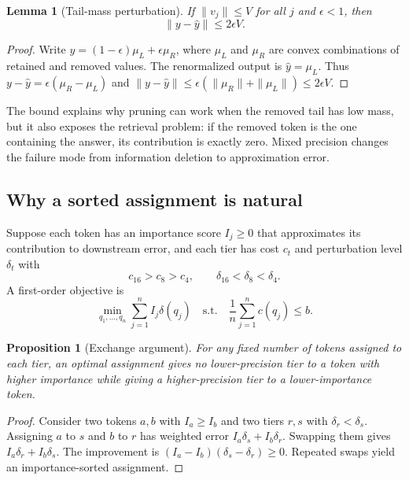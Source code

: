 \documentclass[11pt]{article}
\newcommand{\budget}{b}
\theoremstyle{plain}
\newtheorem{lemma}{Lemma}
\newtheorem{proposition}{Proposition}
\theoremstyle{definition}
\begin{document}
\begin{lemma}[Tail-mass perturbation]
If $\|v_j\|\le V$ for all $j$ and $\epsilon<1$, then
\begin{equation}
  \|y-\hat y\|\le 2\epsilon V .
\end{equation}
\end{lemma}
\begin{proof}
Write $y=(1-\epsilon)\mu_L+\epsilon\mu_R$, where $\mu_L$ and $\mu_R$ are convex combinations of retained and removed values.  The renormalized output is $\hat y=\mu_L$.  Thus $y-\hat y=\epsilon(\mu_R-\mu_L)$ and $\|y-\hat y\|\le \epsilon(\|\mu_R\|+\|\mu_L\|)\le 2\epsilon V$.
\end{proof}

The bound explains why pruning can work when the removed tail has low mass, but it also exposes the retrieval problem: if the removed token is the one containing the answer, its contribution is exactly zero.  Mixed precision changes the failure mode from information deletion to approximation error.

\subsection{Why a sorted assignment is natural}
Suppose each token has an importance score $I_j\ge 0$ that approximates its contribution to downstream error, and each tier has cost $c_t$ and perturbation level $\delta_t$ with
\begin{equation}
 c_{16}>c_8>c_4,
 \qquad
 \delta_{16}<\delta_8<\delta_4 .
\end{equation}
A first-order objective is
\begin{equation}
  \min_{q_1,\ldots,q_n}\sum_{j=1}^{n} I_j\delta(q_j)
  \quad\text{s.t.}\quad
  \frac{1}{n}\sum_{j=1}^{n}c(q_j)\le \budget .
  \label{eq:assignment}
\end{equation}

\begin{proposition}[Exchange argument]
For any fixed number of tokens assigned to each tier, an optimal assignment gives no lower-precision tier to a token with higher importance while giving a higher-precision tier to a lower-importance token.
\end{proposition}
\begin{proof}
Consider two tokens $a,b$ with $I_a\ge I_b$ and two tiers $r,s$ with $\delta_r<\delta_s$.  Assigning $a$ to $s$ and $b$ to $r$ has weighted error $I_a\delta_s+I_b\delta_r$.  Swapping them gives $I_a\delta_r+I_b\delta_s$.  The improvement is $(I_a-I_b)(\delta_s-\delta_r)\ge 0$.  Repeated swaps yield an importance-sorted assignment.
\end{proof}
\end{document}
